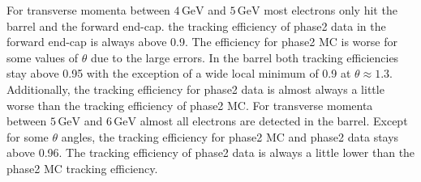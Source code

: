 \documentclass[a4paper,11pt,twosided,final,german,openbib,pdftex,listof=totoc,bibliography=totoc]{scrbook}
\begin{document}
For transverse momenta between $4\,\textrm{GeV}$ and $5\,\textrm{GeV}$ most electrons only hit the barrel and the forward end-cap. the tracking efficiency of phase2 data in the forward end-cap is always above 0.9. The efficiency for phase2 MC is worse for some values of $\theta$ due to the large errors. In the barrel both tracking efficiencies stay above 0.95 with the exception of a wide local minimum of 0.9 at $\theta \approx 1.3$. Additionally, the tracking efficiency for phase2 data is almost always a little worse than the tracking efficiency of phase2 MC.
For transverse momenta between $5\,\textrm{GeV}$ and $6\,\textrm{GeV}$ almost all electrons are detected in the barrel. Except for some $\theta$ angles, the tracking efficiency for phase2 MC and phase2 data stays above 0.96. The tracking efficiency of phase2 data is always a little lower than the phase2 MC tracking efficiency. 
\end{document}
